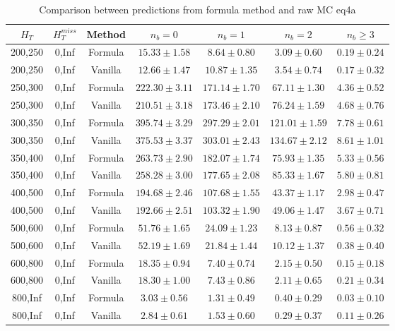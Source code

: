 
\begin{longtable}{ | c | c | c | c | c | c | c | }
\caption{Comparison between predictions from formula method and raw MC eq4a} \label{tab:formula-eq4a} \\    \hline 
$H_{T}$ & $H_{T}^{miss}$ & Method & $n_{b} = 0$ & $n_{b} = 1$ & $n_{b} = 2$ & $n_{b} \ge 3$ \\ \hline200,250 & 0,Inf & Formula  & $    15.33 \pm  1.58 $ & $     8.64 \pm  0.80 $ & $     3.09 \pm  0.60 $ & $     0.19 \pm  0.24 $  \\  
200,250 & 0,Inf & Vanilla  & $    12.66 \pm  1.47 $ & $    10.87 \pm  1.35 $ & $     3.54 \pm  0.74 $ & $     0.17 \pm  0.32 $  \\ \hline 
250,300 & 0,Inf & Formula  & $   222.30 \pm  3.11 $ & $   171.14 \pm  1.70 $ & $    67.11 \pm  1.30 $ & $     4.36 \pm  0.52 $  \\  
250,300 & 0,Inf & Vanilla  & $   210.51 \pm  3.18 $ & $   173.46 \pm  2.10 $ & $    76.24 \pm  1.59 $ & $     4.68 \pm  0.76 $  \\ \hline 
300,350 & 0,Inf & Formula  & $   395.74 \pm  3.29 $ & $   297.29 \pm  2.01 $ & $   121.01 \pm  1.59 $ & $     7.78 \pm  0.61 $  \\  
300,350 & 0,Inf & Vanilla  & $   375.53 \pm  3.37 $ & $   303.01 \pm  2.43 $ & $   134.67 \pm  2.12 $ & $     8.61 \pm  1.01 $  \\ \hline 
350,400 & 0,Inf & Formula  & $   263.73 \pm  2.90 $ & $   182.07 \pm  1.74 $ & $    75.93 \pm  1.35 $ & $     5.33 \pm  0.56 $  \\  
350,400 & 0,Inf & Vanilla  & $   258.28 \pm  3.00 $ & $   177.65 \pm  2.08 $ & $    85.33 \pm  1.67 $ & $     5.80 \pm  0.81 $  \\ \hline 
400,500 & 0,Inf & Formula  & $   194.68 \pm  2.46 $ & $   107.68 \pm  1.55 $ & $    43.37 \pm  1.17 $ & $     2.98 \pm  0.47 $  \\  
400,500 & 0,Inf & Vanilla  & $   192.66 \pm  2.51 $ & $   103.32 \pm  1.90 $ & $    49.06 \pm  1.47 $ & $     3.67 \pm  0.71 $  \\ \hline 
500,600 & 0,Inf & Formula  & $    51.76 \pm  1.65 $ & $    24.09 \pm  1.23 $ & $     8.13 \pm  0.87 $ & $     0.56 \pm  0.32 $  \\  
500,600 & 0,Inf & Vanilla  & $    52.19 \pm  1.69 $ & $    21.84 \pm  1.44 $ & $    10.12 \pm  1.37 $ & $     0.38 \pm  0.40 $  \\ \hline 
600,800 & 0,Inf & Formula  & $    18.35 \pm  0.94 $ & $     7.40 \pm  0.74 $ & $     2.15 \pm  0.50 $ & $     0.15 \pm  0.18 $  \\  
600,800 & 0,Inf & Vanilla  & $    18.30 \pm  1.00 $ & $     7.43 \pm  0.86 $ & $     2.11 \pm  0.65 $ & $     0.21 \pm  0.34 $  \\ \hline 
800,Inf & 0,Inf & Formula  & $     3.03 \pm  0.56 $ & $     1.31 \pm  0.49 $ & $     0.40 \pm  0.29 $ & $     0.03 \pm  0.10 $  \\  
800,Inf & 0,Inf & Vanilla  & $     2.84 \pm  0.61 $ & $     1.53 \pm  0.60 $ & $     0.29 \pm  0.37 $ & $     0.11 \pm  0.26 $  \\ \hline 
    \hline 
    \hline 
\end{longtable}